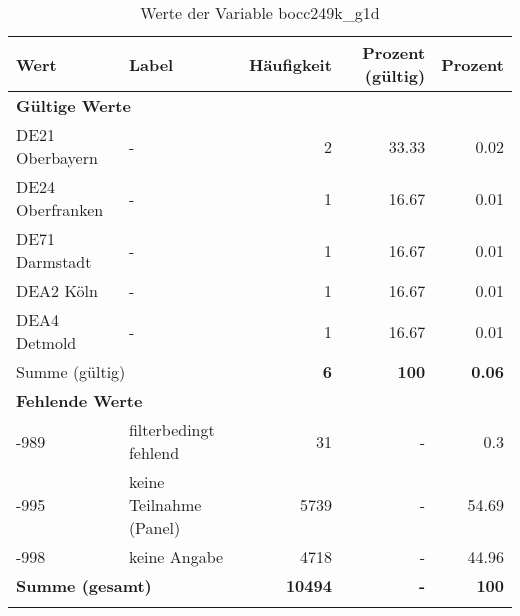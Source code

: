      \begin{longtable}{Xlrrr}
     \toprule
     \textbf{Wert} & \textbf{Label} & \textbf{Häufigkeit} & \textbf{Prozent (gültig)} & \textbf{Prozent} \\
     \endhead
     \midrule
     \multicolumn{5}{l}{\textbf{Gültige Werte}}\\

     \multicolumn{1}{X}{DE21 Oberbayern} &
     - &
     \num{2} &
     \num[round-mode=places,round-precision=2]{33.33} &
     \num[round-mode=places,round-precision=2]{0.02} \\

     \multicolumn{1}{X}{DE24 Oberfranken} &
     - &
     \num{1} &
     \num[round-mode=places,round-precision=2]{16.67} &
     \num[round-mode=places,round-precision=2]{0.01} \\

     \multicolumn{1}{X}{DE71 Darmstadt} &
     - &
     \num{1} &
     \num[round-mode=places,round-precision=2]{16.67} &
     \num[round-mode=places,round-precision=2]{0.01} \\

     \multicolumn{1}{X}{DEA2 Köln} &
     - &
     \num{1} &
     \num[round-mode=places,round-precision=2]{16.67} &
     \num[round-mode=places,round-precision=2]{0.01} \\

     \multicolumn{1}{X}{DEA4 Detmold} &
     - &
     \num{1} &
     \num[round-mode=places,round-precision=2]{16.67} &
     \num[round-mode=places,round-precision=2]{0.01} \\
     \midrule
      \multicolumn{2}{l}{Summe (gültig)} & \textbf{\num{6}} &
      \textbf{\num{100}} &
         \textbf{\num[round-mode=places,round-precision=2]{0.06}} \\
     \multicolumn{5}{l}{\textbf{Fehlende Werte}}\\
       -989 & filterbedingt fehlend & \num{31} & - & \num[round-mode=places,round-precision=2]{0.3} \\

       -995 & keine Teilnahme (Panel) & \num{5739} & - & \num[round-mode=places,round-precision=2]{54.69} \\

       -998 & keine Angabe & \num{4718} & - & \num[round-mode=places,round-precision=2]{44.96} \\

     \midrule
     \multicolumn{2}{l}{\textbf{Summe (gesamt)}} & \textbf{\num{10494}} & \textbf{-} & \textbf{\num{100}} \\
     \bottomrule
     \caption{Werte der Variable bocc249k\_g1d}
     \end{longtable}
     
